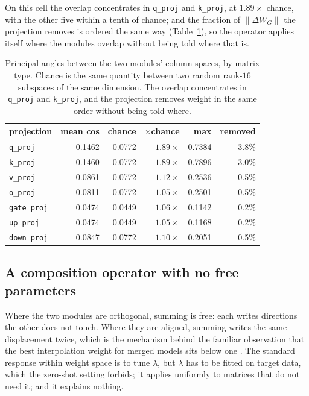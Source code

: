 \documentclass[10pt,twocolumn,a4paper]{article}
\newcommand{\tec}[1]{{\small\texttt{#1}}}
\begin{document}
On this cell the overlap concentrates in \tec{q\_proj} and \tec{k\_proj}, at
$1.89\times$ chance, with the other five within a tenth of chance; and the
fraction of $\lVert\Delta W_G\rVert$ the projection removes is ordered the same
way (Table~\ref{tab:angulos}), so the operator applies itself where the modules
overlap without being told where that is.

\begin{table}[htbp]\centering\footnotesize
\setlength{\tabcolsep}{4pt}
\begin{tabular}{@{}lrrrrr@{}}
\toprule
projection & mean cos & chance & $\times$chance & max & removed \\
\midrule
\tec{q\_proj}    & 0.1462 & 0.0772 & $1.89\times$ & 0.7384 & 3.8\% \\
\tec{k\_proj}    & 0.1460 & 0.0772 & $1.89\times$ & 0.7896 & 3.0\% \\
\tec{v\_proj}    & 0.0861 & 0.0772 & $1.12\times$ & 0.2536 & 0.5\% \\
\tec{o\_proj}    & 0.0811 & 0.0772 & $1.05\times$ & 0.2501 & 0.5\% \\
\tec{gate\_proj} & 0.0474 & 0.0449 & $1.06\times$ & 0.1142 & 0.2\% \\
\tec{up\_proj}   & 0.0474 & 0.0449 & $1.05\times$ & 0.1168 & 0.2\% \\
\tec{down\_proj} & 0.0847 & 0.0772 & $1.10\times$ & 0.2051 & 0.5\% \\
\bottomrule
\end{tabular}
\caption{Principal angles between the two modules' column spaces, by matrix
type. Chance is the same quantity between two random rank-$16$ subspaces of the
same dimension. The overlap concentrates in \tec{q\_proj} and \tec{k\_proj},
and the projection removes weight in the same order without being told where.}
\label{tab:angulos}
\end{table}

\subsection{A composition operator with no free parameters}

Where the two modules are orthogonal, summing is free: each writes directions
the other does not touch. Where they are aligned, summing writes the same
displacement twice, which is the mechanism behind the familiar observation that
the best interpolation weight for merged models sits below one
\cite{wortsman2022,ilharco2023}. The standard response within weight space is to tune
$\lambda$, but $\lambda$ has to be fitted on target data, which the zero-shot
setting forbids; it applies uniformly to matrices that do not need it; and it
explains nothing.
\end{document}
